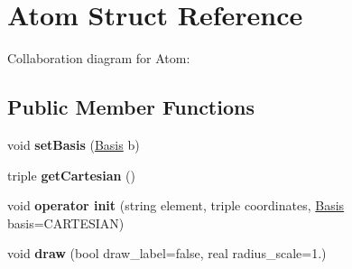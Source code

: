 \hypertarget{structAtom}{\section{Atom Struct Reference}
\label{structAtom}
}


Collaboration diagram for Atom\+:
\subsection*{Public Member Functions}
\begin{DoxyCompactItemize}
\item 
\hypertarget{structAtom_a00e0bc7bbabae5a1cca62b5833a37442}{void {\bfseries set\+Basis} (\hyperlink{structBasis}{Basis} b)}\label{structAtom_a00e0bc7bbabae5a1cca62b5833a37442}

\item 
\hypertarget{structAtom_a14bea39dc6cda7b8a8cb5fdd303b3ee1}{triple {\bfseries get\+Cartesian} ()}\label{structAtom_a14bea39dc6cda7b8a8cb5fdd303b3ee1}

\item 
\hypertarget{structAtom_a879f9242b3da50efaad223a3c0de296b}{void {\bfseries operator init} (string element, triple coordinates, \hyperlink{structBasis}{Basis} basis=C\+A\+R\+T\+E\+S\+I\+A\+N)}\label{structAtom_a879f9242b3da50efaad223a3c0de296b}

\item 
\hypertarget{structAtom_ad8fe31348e246a7ee29db7f875efc5e8}{void {\bfseries draw} (bool draw\+\_\+label=false, real radius\+\_\+scale=1.)}\label{structAtom_ad8fe31348e246a7ee29db7f875efc5e8}

\end{DoxyCompactItemize}
